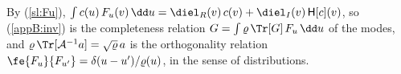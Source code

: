 By (\ref{sl:Fu}), $\int c(u)\,F_u(v)\,\dd u=\diel_R(v)\,c(v)+\diel_I(v)\,\mathsf H[c](v)$, so (\ref{appB:inv}) is the completeness relation $G=\int\varrho\,\Tr[G]\,F_u\,\dd u$ of the modes, and $\varrho\,\Tr[\mathcal A^{-1}a]=\sqrt\varrho\,a$ is the orthogonality relation $\fe{F_u}{F_{u'}}=\delta(u-u')/\varrho(u)$, in the sense of distributions.
